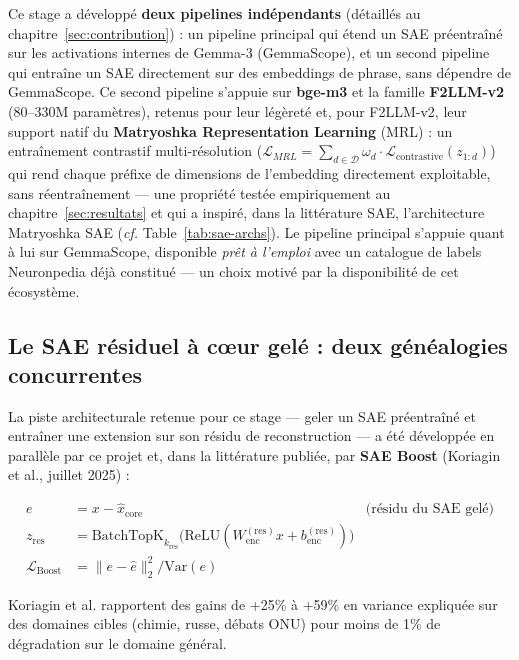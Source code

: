 \documentclass[11pt]{article}
\newcommand{\Var}{\mathrm{Var}}
\begin{document}
Ce stage a développé \textbf{deux pipelines indépendants} (détaillés au
chapitre~\ref{sec:contribution}) : un pipeline principal qui étend un SAE
préentraîné sur les activations internes de Gemma-3 (GemmaScope), et un
second pipeline qui entraîne un SAE directement sur des embeddings de
phrase, sans dépendre de GemmaScope. Ce second pipeline s'appuie
sur \textbf{bge-m3} et la famille \textbf{F2LLM-v2} (80--330M paramètres),
retenus pour leur légèreté et, pour F2LLM-v2, leur support natif du
\textbf{Matryoshka Representation Learning} (MRL) \cite{kusupati2022mrl} : un
entraînement contrastif multi-résolution
($\mathcal{L}_{MRL} = \sum_{d \in \mathcal{D}} \omega_d \cdot
\mathcal{L}_\text{contrastive}(z_{1:d})$) qui rend chaque préfixe de
dimensions de l'embedding directement exploitable, sans réentraînement --- une
propriété testée empiriquement au chapitre~\ref{sec:resultats} et qui a
inspiré, dans la littérature SAE, l'architecture Matryoshka SAE (\emph{cf.}
Table~\ref{tab:sae-archs}). Le pipeline principal s'appuie quant à lui sur
GemmaScope, disponible \emph{prêt à l'emploi} avec un catalogue de labels
Neuronpedia déjà constitué --- un choix motivé par la disponibilité de cet
écosystème.

\subsection{Le SAE résiduel à cœur gelé : deux généalogies concurrentes}
\label{subsec:sae-boost-litt}

La piste architecturale retenue pour ce stage --- geler un SAE préentraîné et
entraîner une extension sur son résidu de reconstruction --- a été développée
en parallèle par ce projet et, dans la littérature publiée, par
\textbf{SAE Boost} \cite{koriagin2025saeboost} (Koriagin et al., juillet 2025) :

\begin{align*}
  e &= x - \hat{x}_\text{core} & \text{(résidu du SAE gelé)} \\
  z_\text{res} &= \text{BatchTopK}_{k_\text{res}}\bigl(\text{ReLU}(W_\text{enc}^{(\text{res})} x + b_\text{enc}^{(\text{res})})\bigr) \\
  \mathcal{L}_\text{Boost} &= \|e - \hat{e}\|_2^2 / \Var(e)
\end{align*}

Koriagin et al. rapportent des gains de +25\% à +59\% en variance expliquée
sur des domaines cibles (chimie, russe, débats ONU) pour moins de 1\% de
dégradation sur le domaine général.
\end{document}
